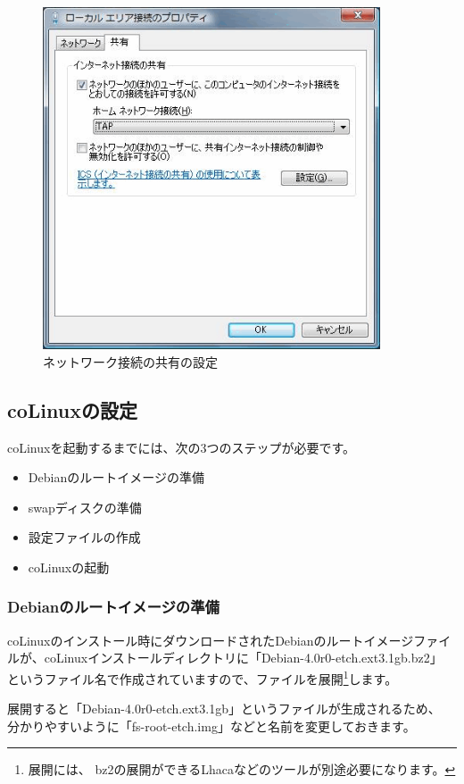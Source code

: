 \documentclass[mingoth,a4paper]{jsarticle}
\begin{document}
\begin{figure}[htbp]
 \begin{center}
  \includegraphics[width=100mm]{image200804/colinux_icssetting.png}
 \end{center}
 \caption{ネットワーク接続の共有の設定}
 \label{fig:icssetting}
\end{figure}

\subsection{coLinuxの設定}
coLinuxを起動するまでには、次の3つのステップが必要です。
\begin{itemize}
\item Debianのルートイメージの準備
\item swapディスクの準備
\item 設定ファイルの作成
\item coLinuxの起動
\end{itemize}

\subsubsection{Debianのルートイメージの準備}
coLinuxのインストール時にダウンロードされたDebianのルートイメージファイ
ルが、coLinuxインストールディレクトリに「Debian-4.0r0-etch.ext3.1gb.bz2」
というファイル名で作成されていますので、ファイルを展開\footnote{展開には、
bz2の展開ができるLhacaなどのツールが別途必要になります。}します。

展開すると「Debian-4.0r0-etch.ext3.1gb」というファイルが生成されるため、
分かりやすいように「fs-root-etch.img」などと名前を変更しておきます。
\end{document}

